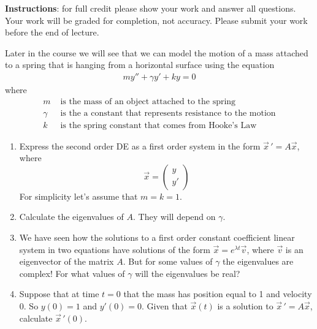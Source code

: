 \documentclass[12pt]{exam}
\begin{document}
\textbf{Instructions}: for full credit please show your work and answer all questions. Your work will be graded for completion, not accuracy. Please submit your work before the end of lecture. 
\begin{questions}

    \question[4] Later in the course we will see that we can model the motion of a mass attached to a spring that is hanging from a horizontal surface using the equation
    \begin{align}\label{Eq:SMS}
        m y'' + \gamma y' + ky = 0
    \end{align} 
    where 
\begin{align*}
    m & \text{ is the mass of an object attached to the spring} \\
    \gamma & \text{ is the a constant that represents resistance to the motion} \\
    k & \text{ is the spring constant that comes from Hooke's Law} 
\end{align*}

\begin{enumerate}[label=\alph*)]
        \item Express the second order DE as a first order system in the form $\vec x \, ' = A\vec x$, where $$\displaystyle  \vec x = \begin{pmatrix} y\\y'\end{pmatrix}$$ For simplicity let's assume that $m=k=1$. 
        \vspace{2cm}
        \item Calculate the eigenvalues of $A$. They will depend on $\gamma$. 
        \vspace{3cm}
        \item We have seen how the solutions to a first order constant coefficient linear system in two equations have solutions of the form $\vec x = e^{\lambda t} \vec v$, where $\vec v$ is an eigenvector of the matrix $A$. But for some values of $\gamma$ the eigenvalues are complex! For what values of $\gamma$ will the eigenvalues be real? 
        \vspace{2cm}
        \item Suppose that at time $t=0$ that the mass has position equal to 1 and velocity 0. So $y(0)=1$ and $y'(0)=0$. Given that $\vec x(t)$ is a solution to $\vec x \,' = A \vec x$, calculate $\vec x \,'(0)$. 
    \end{enumerate}

\vfill 

\end{questions}
\end{document}
